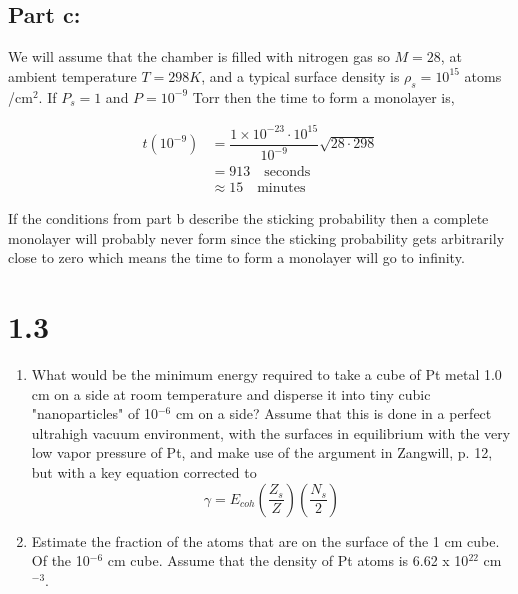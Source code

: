 \documentclass[12pt]{article}
\renewcommand{\=}[1]{\stackrel{#1}{=}} %
\theoremstyle{definition}
\theoremstyle{remark}
\begin{document}
\subsection*{Part c:}

We will assume that the chamber is filled with nitrogen gas so $M=28$, at ambient temperature $T=298K$, and a typical surface density is $\rho_s = 10^{15}$ atoms /cm$^2$. If $P_s = 1$ and $P=10^{-9}$ Torr then the time to form a monolayer is,

\begin{align*}
	t(10^{-9}) &= \dfrac{1\times10^{-23}\cdot10^{15}}{10^{-9}}\sqrt{28 \cdot 298}\\[3mm]
		&= 913 \quad \text{seconds}\\
		&\approx 15 \quad \text{minutes}
\end{align*}

If the conditions from part b describe the sticking probability then a complete monolayer will probably never form since the sticking probability gets arbitrarily close to zero which means the time to form a monolayer will go to infinity.


\newpage
\section*{1.3}
\begin{bclogo}[logo=\bcquestion , barre=none]
\newline
\begin{enumerate}
\item What would be the minimum energy required to take a cube of Pt metal 1.0 cm on a side at room temperature and disperse it into tiny cubic "nanoparticles" of 10$^{-6}$ cm on a side? Assume that this is done in a perfect ultrahigh vacuum environment, with the surfaces in equilibrium with the very low vapor pressure of Pt, and make use of the argument in Zangwill, p. 12, but with a key equation corrected to
\[
	\gamma = E_{coh} \left(\dfrac{Z_s}{Z}\right)\left(\dfrac{N_s}{2}\right)
\]
\item  Estimate the fraction of the atoms that are on the surface of the 1 cm cube. Of the 10$^{-6}$ cm cube. Assume that the density of Pt atoms is 6.62 x 10$^{22}$ cm$^{-3}$. 
\end{enumerate}
\end{bclogo}
\vspace{2mm}
\end{document}
